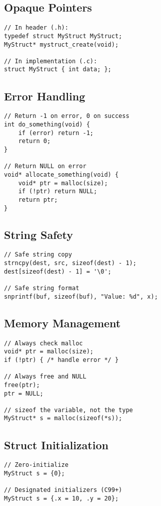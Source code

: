 \documentclass[11pt,openany]{book}
\begin{document}
\subsection*{Opaque Pointers}
\begin{lstlisting}
// In header (.h):
typedef struct MyStruct MyStruct;
MyStruct* mystruct_create(void);

// In implementation (.c):
struct MyStruct { int data; };
\end{lstlisting}

\subsection*{Error Handling}
\begin{lstlisting}
// Return -1 on error, 0 on success
int do_something(void) {
    if (error) return -1;
    return 0;
}

// Return NULL on error
void* allocate_something(void) {
    void* ptr = malloc(size);
    if (!ptr) return NULL;
    return ptr;
}
\end{lstlisting}

\subsection*{String Safety}
\begin{lstlisting}
// Safe string copy
strncpy(dest, src, sizeof(dest) - 1);
dest[sizeof(dest) - 1] = '\0';

// Safe string format
snprintf(buf, sizeof(buf), "Value: %d", x);
\end{lstlisting}

\subsection*{Memory Management}
\begin{lstlisting}
// Always check malloc
void* ptr = malloc(size);
if (!ptr) { /* handle error */ }

// Always free and NULL
free(ptr);
ptr = NULL;

// sizeof the variable, not the type
MyStruct* s = malloc(sizeof(*s));
\end{lstlisting}

\subsection*{Struct Initialization}
\begin{lstlisting}
// Zero-initialize
MyStruct s = {0};

// Designated initializers (C99+)
MyStruct s = {.x = 10, .y = 20};
\end{lstlisting}
\end{document}
